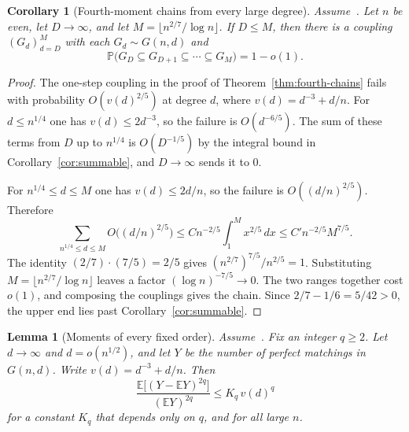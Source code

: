 \documentclass[11pt]{article}
\newtheorem{lemma}[theorem]{Lemma}
\newtheorem{corollary}[theorem]{Corollary}
\newcommand{\Gnd}{G(n,d)}
\newcommand{\EE}{\mathbb{E}}
\newcommand{\PP}{\mathbb{P}}
\begin{document}
\begin{corollary}[Fourth-moment chains from every large degree]
\label{cor:fourth-span}
Assume~\cite[Theorem~6]{Gao20}.
Let \(n\) be even, let \(D\to\infty\), and let
\(M=\lfloor n^{2/7}/\log n\rfloor\). If \(D\le M\), then there is a coupling
\((G_d)_{d=D}^{M}\) with each \(G_d\sim G(n,d)\) and
\[
\PP\bigl(G_D\subseteq G_{D+1}\subseteq\cdots\subseteq G_M\bigr)=1-o(1).
\]
\end{corollary}

\begin{proof}
The one-step coupling in the proof of Theorem~\ref{thm:fourth-chains} fails
with probability \(O(v(d)^{2/5})\) at degree \(d\), where \(v(d)=d^{-3}+d/n\).
For \(d\le n^{1/4}\) one has \(v(d)\le 2d^{-3}\), so the failure is
\(O(d^{-6/5})\). The sum of these terms from \(D\) up to \(n^{1/4}\) is
\(O(D^{-1/5})\) by the integral bound in Corollary~\ref{cor:summable}, and
\(D\to\infty\) sends it to \(0\).

For \(n^{1/4}\le d\le M\) one has \(v(d)\le 2d/n\), so the failure is
\(O((d/n)^{2/5})\). Therefore
\[
\sum_{n^{1/4}\le d\le M}O\bigl((d/n)^{2/5}\bigr)
\le
C n^{-2/5}\int_{1}^{M}x^{2/5}\,dx
\le
C'n^{-2/5}M^{7/5}.
\]
The identity \((2/7)\cdot(7/5)=2/5\) gives \((n^{2/7})^{7/5}/n^{2/5}=1\).
Substituting \(M=\lfloor n^{2/7}/\log n\rfloor\) leaves a factor
\((\log n)^{-7/5}\to 0\). The two ranges together cost \(o(1)\), and composing
the couplings gives the chain. Since \(2/7-1/6=5/42>0\), the upper end lies
past Corollary~\ref{cor:summable}.
\end{proof}

\begin{lemma}[Moments of every fixed order]
\label{lem:high-moment}
Assume~\cite[Theorem~6]{Gao20}. Fix an integer \(q\ge 2\). Let \(d\to\infty\) and
\(d=o(n^{1/2})\), and let \(Y\) be the number of perfect matchings in \(\Gnd\).
Write \(v(d)=d^{-3}+d/n\). Then
\[
\frac{\EE\bigl[(Y-\EE Y)^{2q}\bigr]}{(\EE Y)^{2q}}
\le
K_q\,v(d)^q
\]
for a constant \(K_q\) that depends only on \(q\), and for all large \(n\).
\end{lemma}
\end{document}
